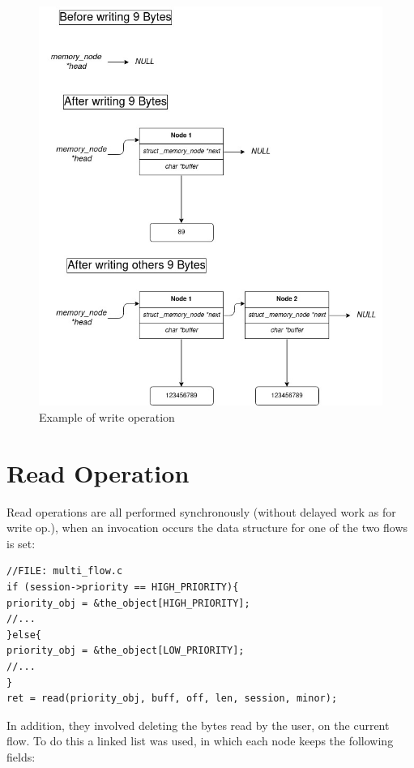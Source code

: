 \documentclass[12pt]{report}
\begin{document}
\begin{figure}[h]
	\centering
	\includegraphics[scale = .45]{write.jpg}
	\caption{Example of write operation}
	\label{fig:write}
\end{figure}




\section{Read Operation}
\label{chap:read operation}

Read operations are all performed synchronously (without delayed work as for write op.), when an invocation occurs the data structure for one of the two flows is set:

\begin{lstlisting}
//FILE: multi_flow.c
if (session->priority == HIGH_PRIORITY){
priority_obj = &the_object[HIGH_PRIORITY];
//...
}else{
priority_obj = &the_object[LOW_PRIORITY];
//...
}
ret = read(priority_obj, buff, off, len, session, minor);
\end{lstlisting}

In addition, they involved deleting the bytes read by the user, on the current flow. To do this a linked list was used, in which each node keeps the following fields:
\end{document}
